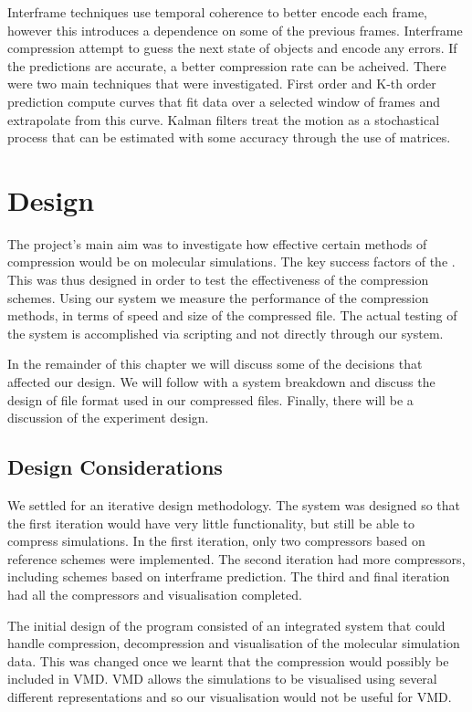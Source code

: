 \documentclass[a4paper,11pt]{report}
\begin{document}
Interframe techniques use temporal coherence to better encode each frame, however this introduces a dependence on some of the previous frames. Interframe compression attempt to guess the next state of objects and encode any errors. If the predictions are accurate, a better compression rate can be acheived. There were two main techniques that were investigated. First order and K-th order prediction compute curves that fit data over a selected window of frames and extrapolate from this curve. Kalman filters treat the motion as a stochastical process that can be estimated with some accuracy through the use of matrices.

\chapter{Design}

The project's main aim was to investigate how effective certain methods of compression would be on molecular simulations. The key success factors of the . This was thus designed in order to test the effectiveness of the compression schemes. Using our system we measure the performance of the compression methods, in terms of speed and size of the compressed file. The actual testing of the system is accomplished via scripting and not directly through our system.

In the remainder of this chapter we will discuss some of the decisions that affected our design. We will follow with a system breakdown and discuss the design of file format used in our compressed files. Finally, there will be a discussion of the experiment design. 

\section{Design Considerations}

We settled for an iterative design methodology. The system was designed so that the first iteration would have very little functionality, but still be able to compress simulations. In the first iteration, only two compressors based on reference schemes were implemented. The second iteration had more compressors, including schemes based on interframe prediction. The third and final iteration had all the compressors and visualisation completed.

The initial design of the program consisted of an integrated system that could handle compression, decompression and visualisation of the molecular simulation data. This was changed once we learnt that the compression would possibly be included in VMD. VMD allows the simulations to be visualised using several different representations and so our visualisation would not be useful for VMD.
\end{document}
